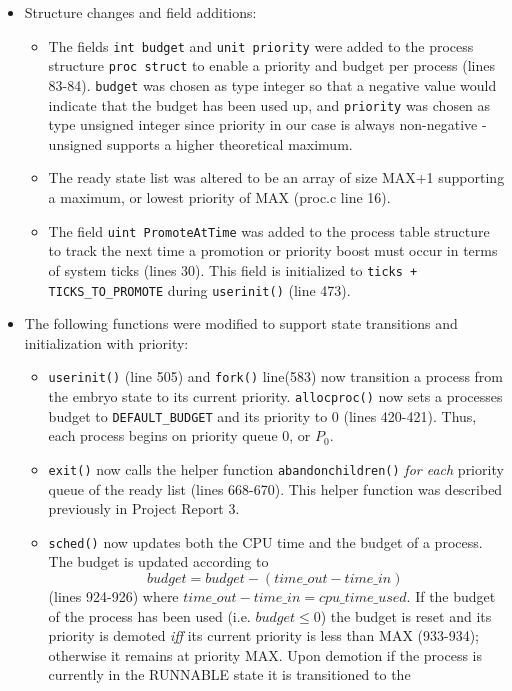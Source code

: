 \documentclass[11pt,letterpaper]{report}
\begin{document}
\begin{itemize}
		\item Structure changes and field additions:
			\begin{itemize}
				\item The fields {\tt int budget} and {\tt unit priority} were added to the process structure {\tt proc struct} to enable a priority and budget per process (lines 83-84).
					{\tt budget} was chosen as type integer so that a negative value would indicate that the budget has been used up, and {\tt priority} was chosen as type
					unsigned integer since priority in our case is always non-negative - unsigned supports a higher theoretical maximum.
				\item The ready state list was altered to be an array of size MAX+1 supporting a maximum, or lowest priority of MAX (proc.c line 16).
				\item The field {\tt uint PromoteAtTime} was added to the process table structure to track the next time a promotion or priority boost must occur in terms of
					system ticks (lines 30). This field
					is initialized to {\tt ticks + TICKS\_TO\_PROMOTE} during {\tt userinit()} (line 473). 
			\end{itemize}	 		
		\item The following functions were modified to support state transitions and initialization with priority:
			\begin{itemize}
				\item {\tt userinit()} (line 505) and {\tt fork()} line(583) now transition a process from the embryo state to its current priority. {\tt allocproc()} now sets a processes budget
					to {\tt DEFAULT\_BUDGET} and its priority to 0 (lines 420-421). Thus, each process begins on priority queue
					0, or $P_0$.
				\item {\tt exit()} now calls the helper function {\tt abandonchildren()} \emph{for each} priority queue of the ready list (lines 668-670). This
					helper function was described previously in Project Report 3.
				\item {\tt sched()} now updates both the CPU time and the budget of a process. The budget is updated according to 
					\begin{equation*}
					budget = budget - (time\_out - time\_in)
\					\end{equation*} (lines 924-926) where $time\_out - time\_in = cpu\_time\_used$. If the budget of the process has been used (i.e. $budget\leq0$) the budget is reset and its priority is demoted \emph{iff} its 
					current priority is less than MAX (933-934); otherwise it remains at priority MAX. Upon demotion if the process is currently in the RUNNABLE state it is transitioned to the 

\end{itemize}
\end{itemize}
\end{document}
